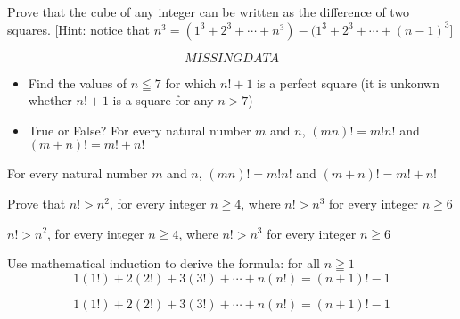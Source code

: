 \newpage
\begin{example}
Prove that the cube of any integer can be written as the difference of two squares.
[Hint: notice that $n^3 = (1^3 + 2^3 + \cdots + n^3) - (1^3 + 2^3 + \cdots + (n-1)^3 $]

\begin{tcolorbox}
    \begin{theorem}
        \begin{equation*}
            MISSING DATA
        \end{equation*} 
    \end{theorem}
\end{tcolorbox}

\end{example}


\newpage
\begin{example}
\begin{itemize}
    \item Find the values of $n \leqq 7$ for which $n! + 1$ is a perfect square (it is unkonwn whether $n! + 1$ is a square for any $n > 7$)
    \item True or False? For every natural number $m$ and $n$, $(mn)! = m!n!$ and $(m+n)! = m! + n!$
\end{itemize}

\begin{tcolorbox}
    \begin{theorem}
         For every natural number $m$ and $n$, $(mn)! = m!n!$ and $(m+n)! = m! + n!$
    \end{theorem}
\end{tcolorbox}

\end{example}


\newpage
\begin{example}
Prove that $n! > n^2$, for every integer $n \geqq 4$, where $n! > n^3$ for every integer $n \geqq 6$

\begin{tcolorbox}
    \begin{theorem}
       	 $n! > n^2$, for every integer $n \geqq 4$, where $n! > n^3$ for every integer $n \geqq 6$
    \end{theorem}
\end{tcolorbox}
\end{example}


\newpage
\begin{example}
Use mathematical induction to derive the formula: for all $n \geqq 1$
    \begin{equation*}
        1(1!) + 2(2!) + 3(3!) + \cdots + n(n!) = (n+1)! - 1
    \end{equation*}

\begin{tcolorbox}
    \begin{theorem}
        \begin{equation*}
            1(1!) + 2(2!) + 3(3!) + \cdots + n(n!) = (n+1)! - 1
        \end{equation*} 
    \end{theorem}
\end{tcolorbox}
\end{example}



